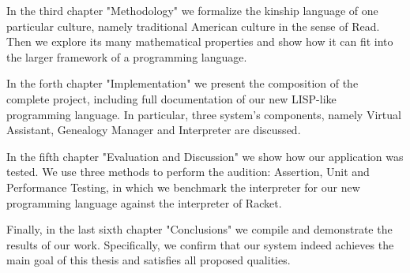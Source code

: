 In the third chapter "Methodology" we formalize the kinship language of one particular culture, namely traditional American
culture in the sense of Read\cite{read}. Then we explore its many mathematical properties and show how it can fit into the larger
framework of a programming language.

In the forth chapter "Implementation" we present the composition of the complete project, including full documentation of our new
LISP-like programming language. In particular, three system's components, namely Virtual Assistant, Genealogy Manager and
Interpreter are discussed.

In the fifth chapter "Evaluation and Discussion" we show how our application was tested. We use three methods to perform the
audition: Assertion, Unit and Performance Testing, in which we benchmark the interpreter for our new programming language against
the interpreter of Racket.

Finally, in the last sixth chapter "Conclusions" we compile and demonstrate the results of our work. Specifically, we confirm that
our system indeed achieves the main goal of this thesis and satisfies all proposed qualities.
